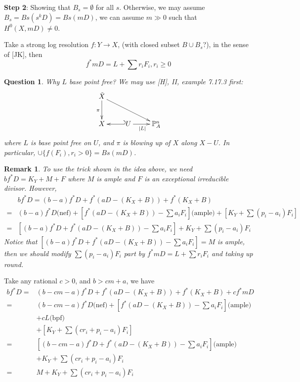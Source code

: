 \documentclass{article}
\newtheorem{rmk}[defn]{Remark}
\newtheorem*{ques}{Question}
\begin{document}
\textbf{Step 2}: Showing that $ B_s=\emptyset $ for all $ s $. Otherwise, we may assume $ B_s=Bs(s^kD)=Bs(mD) $, we can assume $ m\gg 0 $ such that $ H^0(X,mD)\neq 0 $. 

Take a strong log resolution $ f:Y\to X $, (with closed subset $ B\cup B_s $?), in the sense of [JK], then 
$$ f^*mD=L+\sum r_iF_i , r_i\geqslant 0$$


\begin{ques}
	Why $ L $ base point free? We may use [H], II, example 7.17.3 first:
	$$ \xymatrix{
	\tilde{X}\ar[rrd]\ar[d]_{\pi}\\
	X&U\ar@{_(->}[l]\ar[r]_{|L|}&\mathbb{P}^n_A	
	} $$
where $ L $ is base point free on $ U $, and $ \pi $ is blowing up of $ X $ along $ X-U $. In particular, $ \cup \{ f(F_i), r_i>0\}=Bs(mD) $.
\end{ques}

\begin{rmk}
	To use the trick shown in the idea above, we need $ bf^*D=K_Y+M+F $ where $ M $ is ample and $ F $ is an exceptional irreducible divisor. However, 
	\begin{equation*}
	\begin{aligned}
	&bf^*D=(b-a)f^*D+f^*(aD-(K_X+B))+f^*(K_X+B)\\
	=&(b-a)f^*D\text{(nef)}+[f^*(aD-(K_X+B))-\sum a_iF_i]\text{(ample)}+[K_Y+\sum (p_i-a_i)F_i]\\
	=&[(b-a)f^*D+f^*(aD-(K_X+B))-\sum a_iF_i]+K_Y+\sum (p_i-a_i)F_i
	\end{aligned}
	\end{equation*}
	Notice that $ [(b-a)f^*D+f^*(aD-(K_X+B))-\sum a_iF_i]=M $ is ample, then we should modify $ \sum (p_i-a_i)F_i $ part by $ f^*mD=L+\sum r_iF_i $ and taking up round.
\end{rmk}

Take any rational $ c>0 $, and $ b>cm+a $, we have 
\begin{equation*}
\begin{aligned}
bf^*D=&(b-cm-a)f^*D+f^*(aD-(K_X+B))+f^*(K_X+B)+cf^*mD\\
=&(b-cm-a)f^*D\text{(nef)}+[f^*(aD-(K_X+B))-\sum a_iF_i]\text{(ample)}\\
&+cL\text{(bpf)}\\
&+[K_Y+\sum (cr_i+p_i-a_i)F_i]\\
=&[(b-cm-a)f^*D+f^*(aD-(K_X+B))-\sum a_iF_i]\text{(ample)}\\
&+K_Y+\sum (cr_i+p_i-a_i)F_i\\
=&M+K_Y+\sum(cr_i+p_i-a_i)F_i
\end{aligned}
\end{equation*} 
\end{document}
